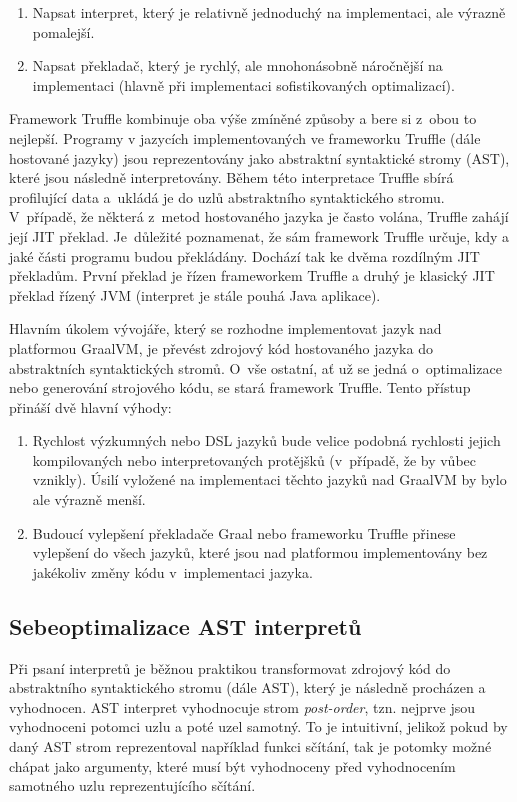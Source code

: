\documentclass[
  master,
  biblatex,
  figures=true,
  theorems,
  sourcecodes,
  glossaries,
  index
]{kidiplom}
\begin{document}
\begin{enumerate}
    \item Napsat interpret, který je relativně jednoduchý na implementaci, ale výrazně pomalejší.
    \item Napsat překladač, který je rychlý, ale mnohonásobně náročnější na implementaci (hlavně při implementaci sofistikovaných optimalizací).
\end{enumerate}

Framework Truffle kombinuje oba výše zmíněné způsoby a bere si z~obou to nejlepší. Programy v jazycích implementovaných ve frameworku Truffle (dále hostované jazyky) jsou reprezentovány jako abstraktní syntaktické stromy (AST), které jsou následně interpretovány. Během této interpretace Truffle sbírá profilující data a~ukládá je do uzlů abstraktního syntaktického stromu. V~případě, že některá z~metod hostovaného jazyka je často volána, Truffle zahájí její JIT překlad. Je~důležité poznamenat, že sám framework Truffle určuje, kdy a jaké části programu budou překládány. Dochází tak ke dvěma rozdílným JIT překladům. První překlad je řízen frameworkem Truffle a druhý je klasický JIT překlad řízený JVM (interpret je stále pouhá Java aplikace).



Hlavním úkolem vývojáře, který se rozhodne implementovat jazyk nad platformou GraalVM, je převést zdrojový kód hostovaného jazyka do abstraktních syntaktických stromů. O~vše ostatní, ať už se jedná o~optimalizace nebo generování strojového kódu, se stará framework Truffle. Tento přístup přináší dvě hlavní výhody:


\begin{enumerate}
    \item Rychlost výzkumných nebo DSL jazyků bude velice podobná rychlosti jejich kompilovaných nebo interpretovaných protějšků (v~případě, že by vůbec vznikly). Úsilí vyložené na implementaci těchto jazyků nad GraalVM by bylo ale výrazně menší.
    \item Budoucí vylepšení překladače Graal nebo frameworku Truffle přinese vylepšení do všech jazyků, které jsou nad platformou implementovány bez jakékoliv změny kódu v~implementaci jazyka. 
\end{enumerate}



\subsection{Sebeoptimalizace AST interpretů}
\label{self-optimalization-of-ast-interpreters}
Při psaní interpretů je běžnou praktikou transformovat zdrojový kód do abstraktního syntaktického stromu (dále AST), který je následně procházen a vyhodnocen. AST interpret vyhodnocuje strom \textit{post-order}, tzn. nejprve jsou vyhodnoceni potomci uzlu a poté uzel samotný. To je intuitivní, jelikož pokud by daný AST strom reprezentoval například funkci sčítání, tak je potomky možné chápat jako argumenty, které musí být vyhodnoceny před vyhodnocením samotného uzlu reprezentujícího sčítání. 
\end{document}
